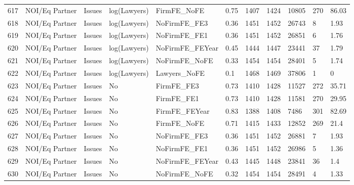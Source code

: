 \documentclass{article}
\begin{document}
\begin{table}[H]
\begin{tabular}{rllllllllll}
  617 & NOI/Eq Partner & Issues & log(Lawyers) & FirmFE\_NoFE & 0.75 & 1407 & 1424 & 10805 & 270 & 86.03 \\ 
  618 & NOI/Eq Partner & Issues & log(Lawyers) & NoFirmFE\_FE3 & 0.36 & 1451 & 1452 & 26743 & 8 & 1.93 \\ 
  619 & NOI/Eq Partner & Issues & log(Lawyers) & NoFirmFE\_FE1 & 0.36 & 1451 & 1452 & 26851 & 6 & 1.76 \\ 
  620 & NOI/Eq Partner & Issues & log(Lawyers) & NoFirmFE\_FEYear & 0.45 & 1444 & 1447 & 23441 & 37 & 1.79 \\ 
  621 & NOI/Eq Partner & Issues & log(Lawyers) & NoFirmFE\_NoFE & 0.33 & 1454 & 1454 & 28401 & 5 & 1.74 \\ 
  622 & NOI/Eq Partner & Issues & log(Lawyers) & Lawyers\_NoFE & 0.1 & 1468 & 1469 & 37806 & 1 & 0 \\ 
  623 & NOI/Eq Partner & Issues & No & FirmFE\_FE3 & 0.73 & 1410 & 1428 & 11527 & 272 & 35.71 \\ 
  624 & NOI/Eq Partner & Issues & No & FirmFE\_FE1 & 0.73 & 1410 & 1428 & 11581 & 270 & 29.95 \\ 
  625 & NOI/Eq Partner & Issues & No & FirmFE\_FEYear & 0.83 & 1388 & 1408 & 7486 & 301 & 82.69 \\ 
  626 & NOI/Eq Partner & Issues & No & FirmFE\_NoFE & 0.71 & 1415 & 1433 & 12852 & 269 & 21.4 \\ 
  627 & NOI/Eq Partner & Issues & No & NoFirmFE\_FE3 & 0.36 & 1451 & 1452 & 26881 & 7 & 1.93 \\ 
  628 & NOI/Eq Partner & Issues & No & NoFirmFE\_FE1 & 0.36 & 1451 & 1452 & 26986 & 5 & 1.36 \\ 
  629 & NOI/Eq Partner & Issues & No & NoFirmFE\_FEYear & 0.43 & 1445 & 1448 & 23841 & 36 & 1.4 \\ 
  630 & NOI/Eq Partner & Issues & No & NoFirmFE\_NoFE & 0.32 & 1454 & 1454 & 28491 & 4 & 1.33 \\ 
   \hline
\end{tabular}
\end{table}
\end{document}
